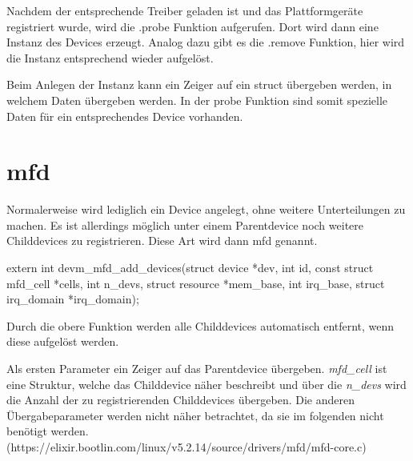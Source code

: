 Nachdem der entsprechende Treiber geladen ist und das Plattformgeräte registriert wurde, wird die .probe Funktion aufgerufen. Dort wird dann eine Instanz des Devices erzeugt. Analog dazu gibt es die .remove Funktion, hier wird die Instanz entsprechend wieder aufgelöst. \cite{corbetplatform} 

Beim Anlegen der Instanz kann ein Zeiger auf ein struct übergeben werden, in welchem Daten übergeben werden. In der probe Funktion sind somit spezielle Daten für ein entsprechendes Device vorhanden. \cite{corbetplatform} 

\section{\acl{mfd}}\label{sec:mfd_t}
Normalerweise wird lediglich ein Device angelegt, ohne weitere Unterteilungen zu machen. Es ist allerdings möglich unter einem Parentdevice noch weitere Childdevices zu registrieren. Diese Art wird dann \acf{mfd} genannt.

\begin{minipage}{\textwidth}
	\begin{bash}
extern int devm_mfd_add_devices(struct device *dev, int id, 
		const struct mfd_cell *cells, int n_devs, 
		struct resource *mem_base, int irq_base, 
		struct irq_domain *irq_domain);
	\end{bash}
\end{minipage}

Durch die obere Funktion werden alle Childdevices automatisch entfernt, wenn diese aufgelöst werden.

Als ersten Parameter ein Zeiger auf das Parentdevice übergeben. \textit{mfd\_cell} ist eine Struktur, welche das Childdevice näher beschreibt und über die \textit{n\_devs} wird die Anzahl der zu registrierenden Childdevices übergeben. Die anderen Übergabeparameter werden nicht näher betrachtet, da sie im folgenden nicht benötigt werden. 
(https://elixir.bootlin.com/linux/v5.2.14/source/drivers/mfd/mfd-core.c)




